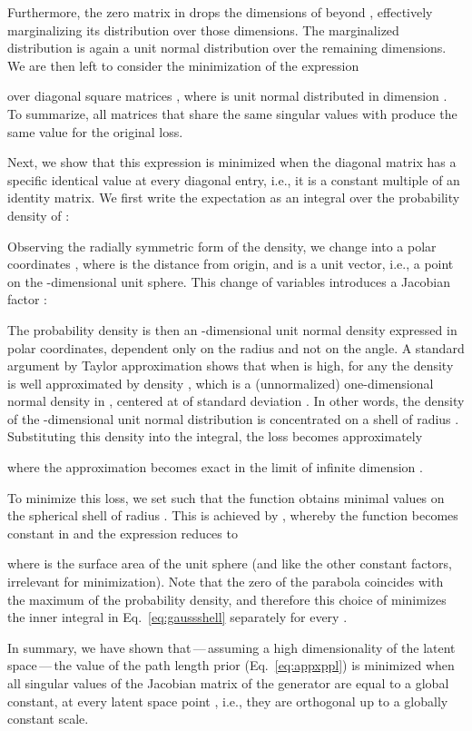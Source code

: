\documentclass[10pt,twocolumn,letterpaper]{article}
\begin{document}
Furthermore, the zero matrix in  drops the dimensions of  beyond , effectively marginalizing its distribution over those dimensions. The marginalized distribution is again a unit normal distribution over the remaining  dimensions. We are then left to consider the minimization of the expression

over diagonal square matrices , where  is unit normal distributed in dimension . To summarize, all matrices  that share the same singular values with  produce the same value for the original loss.

Next, we show that this expression is minimized when the diagonal matrix  has a specific identical value at every diagonal entry, i.e., it is a constant multiple of an identity matrix. We first write the expectation as an integral over the probability density of :

Observing the radially symmetric form of the density, we change into a polar coordinates , where  is the distance from origin, and  is a unit vector, i.e., a point on the -dimensional unit sphere. This change of variables introduces a Jacobian factor :


The probability density  is then an -dimensional unit normal density expressed in polar coordinates, dependent only on the radius and not on the angle. A standard argument by Taylor approximation shows that when  is high, for any  the density is well approximated by density , which is a (unnormalized) one-dimensional normal density in , centered at  of standard deviation  \cite{Bishop2006}. In other words, the density of the -dimensional unit normal distribution is concentrated on a shell of radius . Substituting this density into the integral, the loss becomes approximately

where the approximation becomes exact in the limit of infinite dimension .

To minimize this loss, we set  such that the function  obtains minimal values on the spherical shell of radius . This is achieved by , whereby the function becomes constant in  and the expression reduces to

where  is the surface area of the unit sphere (and like the other constant factors, irrelevant for minimization). Note that the zero of the parabola  coincides with the maximum of the probability density, and therefore this choice of  minimizes the inner integral in Eq.~\ref{eq:gaussshell} separately for every .

In summary, we have shown that\,---\,assuming a high dimensionality  of the latent space\,---\,the value of the path length prior (Eq.~\ref{eq:appxppl}) is minimized when all singular values of the Jacobian matrix of the generator are equal to a global constant, at every latent space point , i.e., they are orthogonal up to a globally constant scale.
\end{document}
